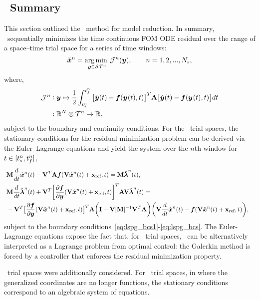 



\subsection{\methodAcronym\ Summary}
This section outlined the \methodAcronym\ method for model reduction. In summary, \methodAcronym\ sequentially minimizes the time continuous FOM ODE residual over the range of a space--time trial space for a series of time windows:
\begin{equation*}
\approxstate^n= \underset{\statey \in \stspace^n}{\text{arg\,min } }
\mathcal{J}^n(\statey), \qquad n = 1,2,...,\nslabs,
\end{equation*}
where,
\begin{align*}
\mathcal{J}^n &\vcentcolon \statey \mapsto
\frac{1}{2} \int_{\timeStartArg{n}}^{\timeEndArg{n}} \big[ \dot{\statey}(t)
- \velocity(\stateyArg{}{t},t) \big]^T \stweightingMatArg{n} \big[
\dot{\statey}(t) - \velocity(\stateyArg{}{t},t) \big] d t \\
&\vcentcolon \RR{\fomdim}\otimes \timeSpaceArg{n} \rightarrow
\RR{},
\end{align*}
subject to the boundary and continuity conditions. For the \spatialAcronym\ trial spaces, the stationary conditions for the residual minimization problem can be derived via the Euler--Lagrange equations and yield the system over the $n$th window for $t \in [\timeStartArg{n},\timeEndArg{n}]$,
\begin{align*}\
&\mass \frac{d}{dt} \genstateArg{n}{t}  -  \basisspace^T
\stweightingMatArgt{n}{t} \velocity(\veloargsromn) =  \mass \adjointArg{n}{t} , \\
 &\mass \frac{d}{dt} \adjointArg{n}{t}  + \basisspace^T \bigg[\frac{\partial
\velocity}{\partial \statey} (\veloargsromn) \bigg]^T \stweightingMatArgt{n}{t} \basisspace
 \adjointArg{n}{t} = \nonumber \\ 
&-\basisspace^T \big[
\frac{\partial \velocity}{\partial \statey}(\veloargsromn) \big]^T \stweightingMatArgt{n}{t} \bigg( \mathbf{I} -
\basisspace [\massArgt{n}{t}]^{-1} \basisspace^T \stweightingMatArgt{n}{t} \bigg)
 \bigg( \basisspace \frac{d}{dt}\genstateArg{n}{t}  -
\velocity(\veloargsromn) \bigg),  &
\end{align*} 
subject to the boundary conditions~\eqref{eq:lspg_bcs1}-\eqref{eq:lspg_bcs}. The Euler-Lagrange equations expose the fact that, for \spatialAcronym\
trial spaces, \methodAcronym\ can be alternatively interpreted as a Lagrange problem from optimal control: the Galerkin method is forced by a 
controller that enforces the residual minimization property. 

\spaceTimeAcronym\ trial spaces were additionally considered. For \spaceTimeAcronym\ trial spaces, in where the generalized coordinates are no longer functions, the stationary conditions correspond to an algebraic system of equations.
